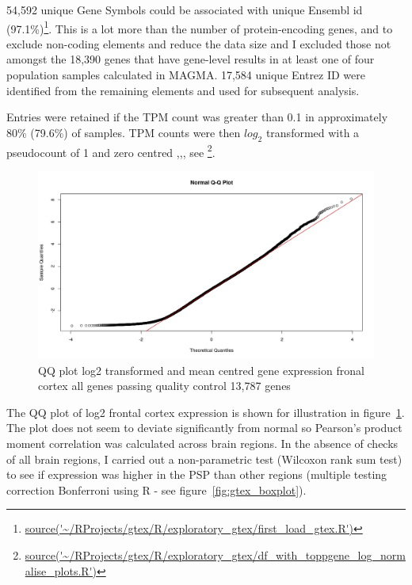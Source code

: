 54,592 unique Gene Symbols could be associated with unique Ensembl id (97.1\%)\footnote{\url{source('~/RProjects/gtex/R/exploratory_gtex/first_load_gtex.R')}}. This is a lot more than the number of protein-encoding genes, and to exclude non-coding elements and reduce the data size and I excluded those not amongst the 18,390 genes that have gene-level results in at least one of four population samples calculated in MAGMA. 17,584 unique Entrez ID were identified from the remaining elements and used for subsequent analysis.

Entries were retained if the TPM count was greater than 0.1 in approximately 80\% (79.6\%) of samples. TPM counts were then $log_2$ transformed with a pseudocount of 1 and zero centred  \cite{sniekers2017genome},\cite{taskesen20162d},\cite{mele2015human}, see \cite{zhao2017gene}\footnote{\url{source('~/RProjects/gtex/R/exploratory_gtex/df_with_toppgene_log_normalise_plots.R')}}.



\begin{figure}
    \centering
    \includegraphics[width=\textwidth]{images/Rplot_rough_qq.png}
    \caption{QQ plot log2 transformed and mean centred gene expression fronal cortex all genes passing quality control 13,787 genes}
    \label{fig:qqplot frontal cortex}
\end{figure}

The QQ plot of log2 frontal cortex expression is shown for illustration in figure~\ref{fig:qqplot frontal cortex}. The plot does not seem to deviate significantly from normal so Pearson's product moment correlation was calculated across brain regions. In the absence of checks of all brain regions, I carried out a non-parametric test (Wilcoxon rank sum test) to see if expression was higher in the PSP than other regions (multiple testing correction Bonferroni using R - see figure~\ref{fig:gtex_boxplot}).


